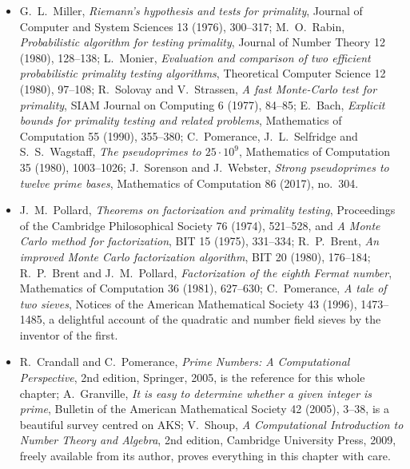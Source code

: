 \begin{itemize}
\item G.~L.~Miller, \emph{Riemann's hypothesis and tests for primality}, Journal of Computer and System Sciences 13 (1976), 300--317; M.~O.~Rabin, \emph{Probabilistic algorithm for testing primality}, Journal of Number Theory 12 (1980), 128--138; L.~Monier, \emph{Evaluation and comparison of two efficient probabilistic primality testing algorithms}, Theoretical Computer Science 12 (1980), 97--108; R.~Solovay and V.~Strassen, \emph{A fast Monte-Carlo test for primality}, SIAM Journal on Computing 6 (1977), 84--85; E.~Bach, \emph{Explicit bounds for primality testing and related problems}, Mathematics of Computation 55 (1990), 355--380;
C.~Pomerance, J.~L.~Selfridge and S.~S.~Wagstaff, \emph{The pseudoprimes to $25\cdot10^9$}, Mathematics of Computation 35 (1980), 1003--1026; J.~Sorenson and J.~Webster, \emph{Strong pseudoprimes to twelve prime bases}, Mathematics of Computation 86 (2017), no.~304.
\item J.~M.~Pollard, \emph{Theorems on factorization and primality testing}, Proceedings of the Cambridge Philosophical Society 76 (1974), 521--528, and \emph{A Monte Carlo method for factorization}, BIT 15 (1975), 331--334; R.~P.~Brent, \emph{An improved Monte Carlo factorization algorithm}, BIT 20 (1980), 176--184; R.~P.~Brent and J.~M.~Pollard, \emph{Factorization of the eighth Fermat number}, Mathematics of Computation 36 (1981), 627--630; C.~Pomerance, \emph{A tale of two sieves}, Notices of the American Mathematical Society 43 (1996), 1473--1485, a delightful account of the quadratic and number field sieves by the inventor of the first.
\item R.~Crandall and C.~Pomerance, \emph{Prime Numbers: A Computational Perspective}, 2nd edition, Springer, 2005, is the reference for this whole chapter; A.~Granville, \emph{It is easy to determine whether a given integer is prime}, Bulletin of the American Mathematical Society 42 (2005), 3--38, is a beautiful survey centred on AKS; V.~Shoup, \emph{A Computational Introduction to Number Theory and Algebra}, 2nd edition, Cambridge University Press, 2009, freely available from its author, proves everything in this chapter with care.
\end{itemize}
